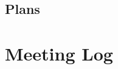\documentclass[11pt, a4paper]{report}
\begin{document}

\subsection*{Plans}

\newpage
\section*{Meeting Log}


\end{document}
